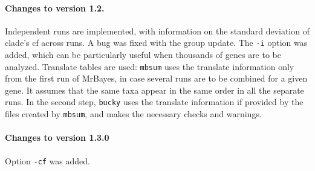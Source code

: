 \documentclass[12pt,english,final,letterpaper]{article}
\begin{document}
\paragraph{Changes to version 1.2.}
Independent runs are implemented, with information on the standard deviation
of clade's {\sc cf} across runs. A bug was fixed with the group update.
The {\tt -i} option was added, which can be particularly useful when
thousands of genes are to be analyzed. Translate tables are used: {\tt mbsum}
uses the translate information only from the first run of MrBayes,
in case several runs are to be combined for a given gene. It assumes
that the same taxa appear in the same order in all the separate runs.
In the second step, {\tt bucky} uses the translate information if provided 
by the files created by {\tt mbsum}, and makes the necessary checks and
warnings.

\paragraph{Changes to version 1.3.0}
Option {\tt -cf} was added.
\end{document}
